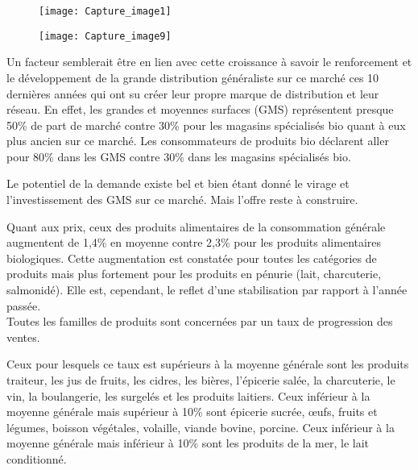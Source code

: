 \documentclass[12pt,a4paper]{report}
\begin{document}
	
		
		\begin{figure}[h]
			\begin{minipage}[c]{.46\linewidth}
				\centering
				\texttt{[image: Capture\_image1]}
			\end{minipage}
			\hfill%
			\begin{minipage}[c]{.46\linewidth}
				\centering
				\texttt{[image: Capture\_image9]}
			\end{minipage}
		\end{figure}
		
		
		Un facteur semblerait être en lien avec cette croissance à savoir le renforcement et le développement de la grande distribution généraliste sur ce marché ces 10 dernières années qui ont su créer leur propre marque de distribution et leur réseau.  En effet, les grandes et moyennes surfaces  (GMS) représentent presque 50\% de part de marché contre 30\% pour les magasins spécialisés bio quant à eux plus ancien sur ce marché.  Les consommateurs de produits bio déclarent aller pour 80\% dans les GMS contre 30\% dans les magasins spécialisés bio. 
	
	 Le potentiel de la demande existe bel et bien étant donné le virage et l’investissement des GMS sur ce marché. Mais l’offre reste à construire.
	 
	 Quant aux prix, ceux des produits alimentaires de la consommation générale augmentent de 1,4\% en moyenne contre 2,3\% pour les produits alimentaires biologiques. Cette augmentation est constatée pour toutes les catégories de produits mais plus fortement pour les produits en pénurie (lait, charcuterie, salmonidé). Elle est, cependant, le reflet d’une stabilisation par rapport à l’année passée. \\
	 
	 
	 
	 Toutes les familles de produits sont concernées par un taux de progression des ventes. 
	 
	 Ceux pour lesquels ce taux est supérieurs à la moyenne générale sont les produits traiteur, les jus de fruits, les cidres, les bières, l’épicerie salée, la charcuterie, le vin, la boulangerie, les surgelés et les produits laitiers. Ceux inférieur à la moyenne générale mais supérieur à 10\% sont épicerie sucrée, œufs, fruits et légumes, boisson végétales, volaille, viande bovine, porcine. Ceux inférieur à la moyenne générale mais inférieur à 10\% sont les produits de la mer, le lait conditionné.
	 
\end{document}
